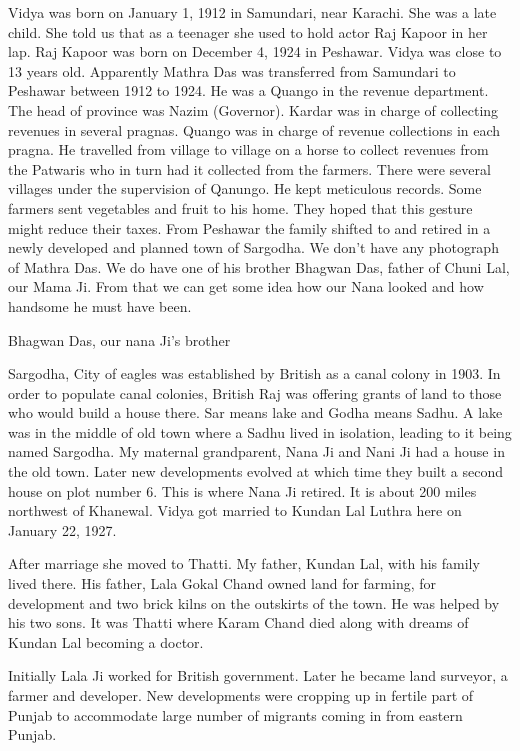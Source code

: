 Vidya was born on January 1, 1912 in Samundari, near Karachi. She was a late child. She told us that as a teenager she used to hold actor Raj Kapoor in her lap. Raj Kapoor was born on December 4, 1924 in Peshawar. Vidya was close to 13 years old. Apparently Mathra Das was transferred from Samundari to Peshawar between 1912 to 1924. He was a Quango in the revenue department. The head of province was Nazim (Governor). Kardar was in charge of collecting revenues in several pragnas. Quango was in charge of revenue collections in each pragna. He travelled from village to village on a horse to collect revenues from the Patwaris who in turn had it collected from the farmers. There were several villages under the supervision of Qanungo. He kept meticulous records. Some farmers sent vegetables and fruit to his home. They hoped that this gesture might reduce their taxes. From Peshawar the family shifted to and retired in a newly developed and planned town of Sargodha. We don’t have any photograph of Mathra Das. We do have one of his brother Bhagwan Das, father of Chuni Lal, our Mama Ji. From that we can get some idea how our Nana looked and how handsome he must have been. 

 
Bhagwan Das, our nana Ji’s brother

Sargodha, City of eagles was established by British as a canal colony in 1903. In order to populate canal colonies, British Raj was offering grants of land to those who would build a house there. 
Sar means lake and Godha means Sadhu. A lake was in the middle of old town where a Sadhu lived in isolation, leading to it being named Sargodha. My maternal grandparent, Nana Ji and Nani Ji had a house in the old town. Later new developments evolved at which time they built a second house on plot number 6. 
This is where Nana Ji retired. It is about 200 miles northwest of Khanewal. Vidya got married to Kundan Lal Luthra here on January 22, 1927. 

After marriage she moved to Thatti. My father, Kundan Lal, with his family lived there. 
His father, Lala Gokal Chand owned land for farming, for development and two brick kilns on the outskirts of the town. He was helped by his two sons. It was Thatti where Karam Chand died along with dreams of Kundan Lal becoming a doctor. 

Initially Lala Ji worked for British government. Later he became land surveyor, a farmer and developer. New developments were cropping up in fertile part of Punjab to accommodate large number of migrants coming in from eastern Punjab.

